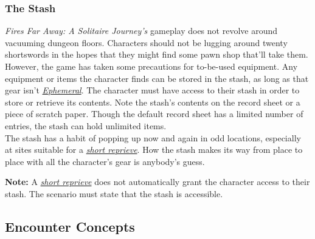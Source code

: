 \documentclass[12pt]{article}
\newcommand{\reftoit}[1]{\hyperlink{#1}{\emph{#1}}}
\begin{document}
\begin{multicols*}{2}
\subsubsection{The Stash}
\emph{Fires Far Away: A Solitaire Journey’s} gameplay does not revolve around vacuuming dungeon floors. Characters should not be lugging around twenty shortswords in the hopes that they might find some pawn shop that’ll take them. However, the game has taken some precautions for to-be-used equipment. Any equipment or items the character finds can be stored in the stash, as long as that gear isn’t \reftoit{Ephemeral}. The character must have access to their stash in order to store or retrieve its contents. Note the stash’s contents on the record sheet or a piece of scratch paper. Though the default record sheet has a limited number of entries, the stash can hold unlimited items.\\
The stash has a habit of popping up now and again in odd locations, especially at sites suitable for a \reftoit{short reprieve}. How the stash makes its way from place to place with all the character’s gear is anybody’s guess.

\begin{tcolorbox}
\textbf{Note:} A \reftoit{short reprieve} does not automatically grant the character access to their stash. The scenario must state that the stash is accessible.
\end{tcolorbox}

\vfill
\pagebreak

\subsection{Encounter Concepts}

\end{multicols*}
\end{document}
